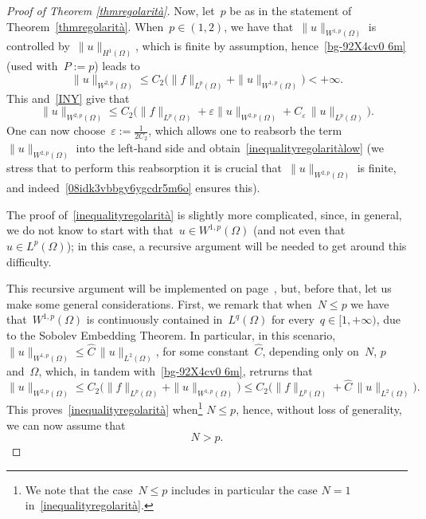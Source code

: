 \documentclass[12pt,a4paper,intlimits,sumlimits]{amsart}
\theoremstyle{definition}
\theoremstyle{plain}
\numberwithin{equation}{section}
\newcommand{\e}{\varepsilon}
\renewcommand{\leq}{\leqslant}
\renewcommand{\le}{\leqslant}
\begin{document}
\begin{proof}[Proof of Theorem \ref{thmregolarità}]
Now, let~$p$ be as in the statement of Theorem~\ref{thmregolarità}.
When~$p\in(1,2)$, we have that~$\|u\|_{W^{1,p}(\Omega)}$
is controlled by~$\|u\|_{H^1(\Omega)}$, which is finite by assumption,
hence~\eqref{bg-92X4cv0 6m}  (used with~$P:=p$)
leads to
\begin{equation}\label{08idk3vbbgy6ygcdr5m6o}
\|u\|_{W^{2,p}(\Omega)}\leq C_2\Big(
\|f\|_{L^p(\Omega)}+\|u\|_{W^{1,p}(\Omega)}\Big)<+\infty.\end{equation}
This and~\eqref{INY} give that
$$ \|u\|_{W^{2,p}(\Omega)}
\le
C_2\Big(
\|f\|_{L^p(\Omega)}+\e\|u\|_{W^{2,p}(\Omega)}+C_\e\,\|u\|_{L^{p}(\Omega)}\Big)
.$$One can now choose~$\e:=\frac{1}{2C_2}$, which allows one
to reabsorb the term~$\|u\|_{W^{2,p}(\Omega)}$
into the left-hand side and obtain~\eqref{inequalityregolaritàlow}
(we stress that to perform this reabsorption it is crucial that~$\|u\|_{W^{2,p}(\Omega)}$
is finite, and indeed~\eqref{08idk3vbbgy6ygcdr5m6o} ensures this).\bigskip

The proof of~\eqref{inequalityregolarità} is slightly more complicated, since, in general,
we do not know to start with that~$u\in W^{1,p}(\Omega)$ (and not even that~$u\in
L^p(\Omega)$); in this case, a recursive argument will be needed to get around this difficulty.

This recursive argument will be implemented on page~\pageref{APKsqwfe-r8ngtoglk4}, 
but, before that, let us make some general considerations.
First,  we remark that when~$N\le p$
we have that~$W^{1,p}(\Omega)$ is continuously contained in~$L^q(\Omega)$
for every~$q\in[1,+\infty)$, due to the Sobolev Embedding Theorem.
In particular, in this scenario, $\|u\|_{W^{1,p}(\Omega)}\le \widehat C\, \|u\|_{L^2(\Omega)}$, for some constant~$\widehat C$, depending only on~$N$, $p$ and~$\Omega$,
which, in tandem with~\eqref{bg-92X4cv0 6m},
retrurns that
\begin{equation*}
\|u\|_{W^{2,p}(\Omega)}\leq C_2\Big(
\|f\|_{L^p(\Omega)}+\|u\|_{W^{1,p}(\Omega)}\Big)\le
C_2\Big(
\|f\|_{L^p(\Omega)}+\widehat C\,\|u\|_{L^2(\Omega)}\Big).
\end{equation*}
This proves~\eqref{inequalityregolarità} when\footnote{We note that the case~$N\le p$
includes in particular the case $N=1$ in~\eqref{inequalityregolarità}.}
$N\le p$,
hence, without loss of generality, we can now assume that
\begin{equation}\label{SLMwe2.12}
N>p.
\end{equation}


\end{proof}
\end{document}
